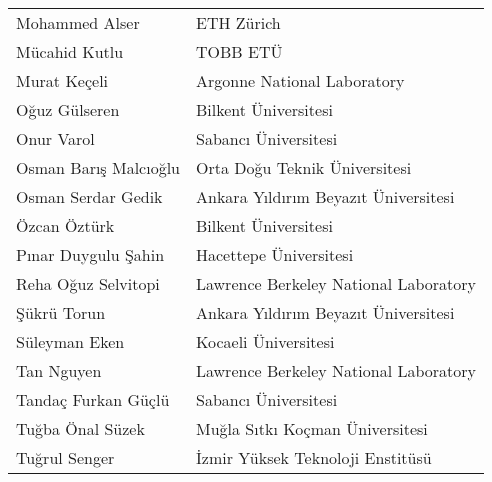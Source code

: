 \begin{tabular}{ll}
Mohammed Alser & ETH Zürich \\
Mücahid Kutlu & TOBB ETÜ \\
Murat Keçeli & Argonne National Laboratory \\
Oğuz Gülseren & Bilkent Üniversitesi \\
Onur Varol & Sabancı Üniversitesi \\
Osman Barış Malcıoğlu & Orta Doğu Teknik Üniversitesi \\
Osman Serdar Gedik & Ankara Yıldırım Beyazıt Üniversitesi \\
Özcan Öztürk & Bilkent Üniversitesi \\
Pınar Duygulu Şahin & Hacettepe Üniversitesi \\
Reha Oğuz Selvitopi & Lawrence Berkeley National Laboratory \\
Şükrü Torun & Ankara Yıldırım Beyazıt Üniversitesi \\
Süleyman Eken & Kocaeli Üniversitesi \\
Tan Nguyen & Lawrence Berkeley National Laboratory \\
Tandaç Furkan Güçlü & Sabancı Üniversitesi \\
Tuğba Önal Süzek & Muğla Sıtkı Koçman Üniversitesi \\
Tuğrul Senger & İzmir Yüksek Teknoloji Enstitüsü 
\end{tabular}



